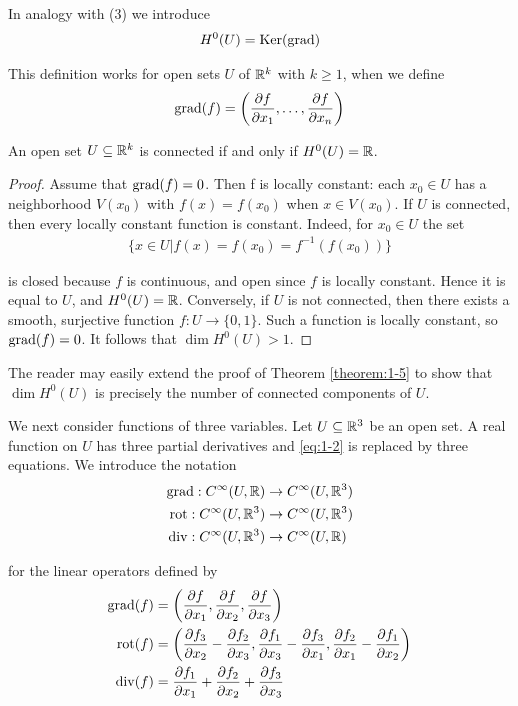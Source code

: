 In analogy with (3) we introduce
\begin{align}\label{eq:1-5}
  H^0(U) = \operatorname{Ker}(\operatorname{grad})
\end{align}

This definition works for open sets $U$ of $\mathbb{R}^k$ with $k\ge1$, when we define
\begin{align*}
  \operatorname{grad}(f) = \left(\frac{\partial f}{\partial x_1}, \ldots, \frac{\partial f}{\partial x_n}\right)
\end{align*}

\begin{theorem}\label{theorem:1-5}
  An open set $U\subseteq\mathbb{R}^k$ is connected if and only if $H^0(U) = \mathbb{R}$.
\end{theorem}

\begin{proof}
  Assume that $\operatorname{grad}(f) = 0$. Then f is locally constant: each $x_0\in U$ has
a neighborhood $V(x_0)$ with $f(x) = f(x_0)$ when $x\in V(x_0)$. If $U$ is connected,
then every locally constant function is constant. Indeed, for $x_0\in U$ the set
\begin{align*}
  \{x\in U|f(x) = f(x_0) = f^{-1}(f(x_0))\}
\end{align*}

is closed because $f$ is continuous, and open since $f$ is locally constant. Hence
it is equal to $U$, and $H^0(U) = \mathbb{R}$. Conversely, if $U$ is not connected, then there
exists a smooth, surjective function $f:U\to \{0, 1\}$. Such a function is locally
constant, so $\operatorname{grad}(f) = 0$. It follows that $\dim H^0(U) > 1$.
\end{proof}

The reader may easily extend the proof of Theorem \ref{theorem:1-5} to show that $\dim H^0(U)$
is precisely the number of connected components of $U$.


We next consider functions of three variables. Let $U\subseteq\mathbb{R}^3$ be an open set. A real
function on $U$ has three partial derivatives and \eqref{eq:1-2} is replaced by three equations.
We introduce the notation
\begin{align*}
  \operatorname{grad}: C^\infty(U, \mathbb{R}) & \to C^\infty(U, \mathbb{R}^3) \\
  \operatorname{rot}: C^\infty(U, \mathbb{R}^3) & \to C^\infty(U, \mathbb{R}^3) \\
  \operatorname{div}: C^\infty(U, \mathbb{R}^3) & \to C^\infty(U, \mathbb{R})
\end{align*}

for the linear operators defined by
\begin{align*}
  \operatorname{grad}(f) & = \left(\frac{\partial f}{\partial x_1}, \frac{\partial f}{\partial x_2}, \frac{\partial f}{\partial x_3}\right) \\
  \operatorname{rot}(f) & = \left(\frac{\partial f_3}{\partial x_2} - \frac{\partial f_2}{\partial x_3}, \frac{\partial f_1}{\partial x_3} - \frac{\partial f_3}{\partial x_1}, \frac{\partial f_2}{\partial x_1} - \frac{\partial f_1}{\partial x_2}\right) \\
  \operatorname{div}(f) & = \frac{\partial f_1}{\partial x_1} + \frac{\partial f_2}{\partial x_2} + \frac{\partial f_3}{\partial x_3}
\end{align*}

